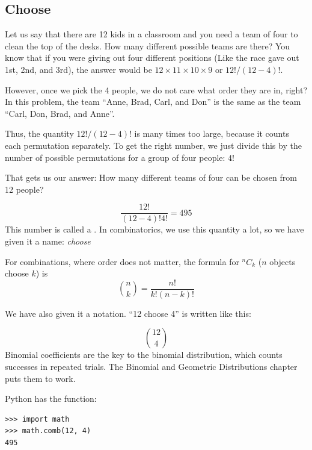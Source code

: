 \subsection{Choose}

Let us say that there are 12 kids in a classroom and you need a team
of four to clean the top of the desks. How many different possible teams are
there? You know that if you were giving out four different positions
(Like the race gave out 1st, 2nd, and 3rd), the answer would be $12\times 11 \times 10 \times 9$ or $12! / (12 - 4)!$.

However, once we pick the 4 people, we do not care what order they are
in, right?  In this problem, the team ``Anne, Brad, Carl, and Don'' is
the same as the team ``Carl, Don, Brad, and Anne''.

Thus, the quantity $12! / (12 - 4)!$ is many times too large, because
it counts each permutation separately. To get the right number, we
just divide this by the number of possible permutations for a group of
four people: $4!$

That gets us our answer: How many different teams of four can be chosen from 12 people?

$$\frac{12!}{(12-4)! 4!}= 495$$
This number is called a . 
In combinatorics, we use this quantity a lot, so we have given it a name: \textit{choose}
\begin{mdframed}[frametitle = {Combinations}, style = important]
For combinations, where order does not matter, the formula for ${}^n C_k$ ($n$ objects choose $k$) is 
$${n \choose k} = \frac{n!}{k!(n-k)!}$$
\end{mdframed}
We have also given it a notation. ``12 choose 4'' is written like this:

$${12 \choose 4}$$
Binomial coefficients are the key to the binomial distribution, which counts successes in repeated trials. The Binomial and Geometric Distributions chapter puts them to work.

Python has the  function:

\begin{verbatim}
>>> import math
>>> math.comb(12, 4)
495  
\end{verbatim}


